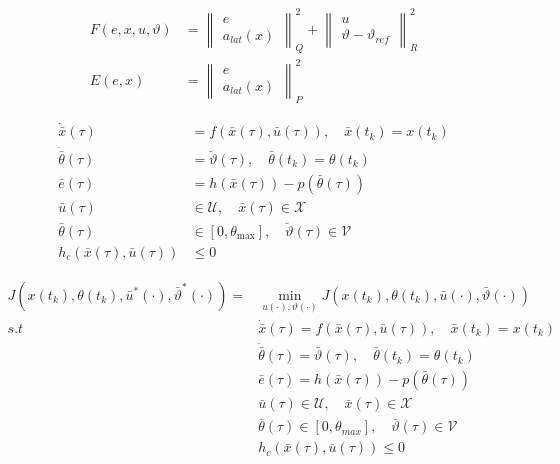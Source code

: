 \begin{align}
    F(e, x, u, \vartheta) &= \left\| \begin{matrix} e \\a_{lat}(x) \end{matrix} \right\|_Q^2 + \left\| \begin{matrix} u \\ \vartheta - \vartheta_{ref} \end{matrix} \right\|_R^2 \\
    E(e, x) &= \left\| \begin{matrix} e \\ a_{lat}(x) \end{matrix} \right\|_P^2
\end{align}

\begin{align}
    \dot{\bar{x}}(\tau) &= f(\bar{x}(\tau), \bar{u}(\tau)), \quad \bar{x}(t_k) = x(t_k) \\
    \dot{\bar{\theta}}(\tau) &= \breve{\vartheta}(\tau), \quad \bar{\theta}(t_k) = \theta(t_k) \\
    \bar{e}(\tau) &= h(\bar{x}(\tau)) - p(\bar{\theta}(\tau)) \\
    \bar{u}(\tau) &\in \mathcal{U}, \quad \bar{x}(\tau) \in \mathcal{X} \\
    \bar{\theta}(\tau) &\in [0, \theta_{\text{max}}], \quad \breve{\vartheta}(\tau) \in \mathcal{V} \\
    h_c(\bar{x}(\tau), \bar{u}(\tau)) &\leq 0
\end{align}

    \begin{subequations}
    \begin{align}
    J(x(t_k),\theta(t_k),\bar{u}^{*}(\cdot),\bar{\vartheta}^{*}(\cdot)) = &\underset{u(\cdot), \vartheta(\cdot)}{\min} J(x(t_k), \theta(t_k), \bar{u}(\cdot), \bar{\vartheta}(\cdot)) \\
    s.t \hspace{30pt}&\dot{\bar{x}}(\tau) = f(\bar{x}(\tau), \bar{u}(\tau)), \quad \bar{x}(t_k) = x(t_k) \label{eq:1a}\\
    &\dot{\bar{\theta}}(\tau) = \bar{\vartheta}(\tau), \quad \bar{\theta}(t_k) = \theta(t_k) \label{eq:1b}\\
    &\bar{e}(\tau) = h(\bar{x}(\tau)) - p(\bar{\theta}(\tau)) \label{eq:1c}\\
    &\bar{u}(\tau) \in \mathcal{U}, \quad \bar{x}(\tau) \in \mathcal{X} \label{eq:1d}\\
    &\bar{\theta}(\tau) \in [0, \theta_{max}], \quad \bar{\vartheta}(\tau) \in \mathcal{V} \label{eq:1e}\\
    &h_c(\bar{x}(\tau), \bar{u}(\tau)) \leq 0 \label{eq:1f}
    \end{align}
    \end{subequations}



